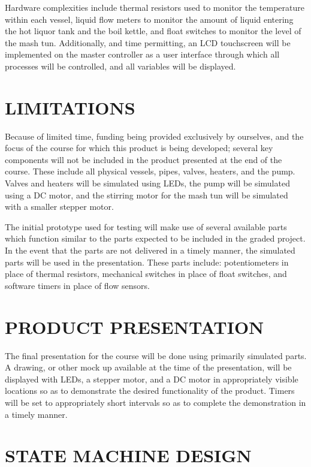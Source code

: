 \documentclass[letterpaper, 10 pt, conference]{ieeeconf}  %
\begin{document}
Hardware complexities include thermal resistors used to monitor the temperature within each vessel, liquid flow meters to monitor the amount of liquid entering the hot liquor tank and the boil kettle, and float switches to monitor the level of the mash tun. Additionally, and time permitting, an LCD touchscreen will be implemented on the master controller as a user interface through which all processes will be controlled, and all variables will be displayed.

\section{LIMITATIONS}

Because of limited time, funding being provided exclusively by ourselves, and the focus of the course for which this product is being developed; several key components will not be included in the product presented at the end of the course. These include all physical vessels, pipes, valves, heaters, and the pump. Valves and heaters will be simulated using LEDs, the pump will be simulated using a DC motor, and the stirring motor for the mash tun will be simulated with a smaller stepper motor.

The initial prototype used for testing will make use of several available parts which function similar to the parts expected to be included in the graded project. In the event that the parts are not delivered in a timely manner, the simulated parts will be used in the presentation. These parts include: potentiometers in place of thermal resistors, mechanical switches in place of float switches, and software timers in place of flow sensors.

\section{PRODUCT PRESENTATION}

The final presentation for the course will be done using primarily simulated parts. A drawing, or other mock up available at the time of the presentation, will be displayed with LEDs, a stepper motor, and a DC motor in appropriately visible locations so as to demonstrate the desired functionality of the product. Timers will be set to appropriately short intervals so as to complete the demonstration in a timely manner.

\section{STATE MACHINE DESIGN}
\end{document}
